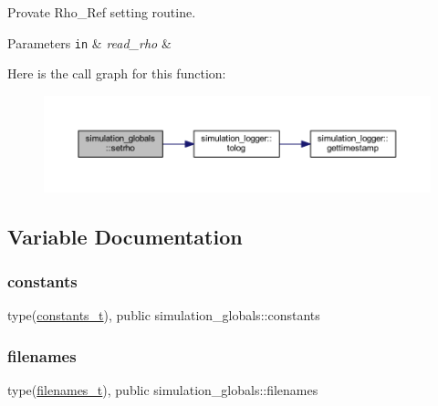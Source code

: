 Provate Rho\+\_\+\+Ref setting routine. 
\begin{DoxyParams}[1]{Parameters}
\mbox{\tt in}  & {\em read\+\_\+rho} & \\
\hline
\end{DoxyParams}
Here is the call graph for this function\+:
\nopagebreak
\begin{figure}[H]
\begin{center}
\leavevmode
\includegraphics[width=350pt]{namespacesimulation__globals_acfdc640757f0275bccb1d8de7bd7dc92_cgraph}
\end{center}
\end{figure}


\subsection{Variable Documentation}
\mbox{\label{namespacesimulation__globals_aa3e1a54abbb08d2c09978a3509ec4303}} 
\subsubsection{\texorpdfstring{constants}{constants}}
{\footnotesize\ttfamily type(\mbox{\hyperlink{structsimulation__globals_1_1constants__t}{constants\+\_\+t}}), public simulation\+\_\+globals\+::constants}

\mbox{\label{namespacesimulation__globals_ada5ae97821ffcb77674c3470431101e3}} 
\subsubsection{\texorpdfstring{filenames}{filenames}}
{\footnotesize\ttfamily type(\mbox{\hyperlink{structsimulation__globals_1_1filenames__t}{filenames\+\_\+t}}), public simulation\+\_\+globals\+::filenames}

